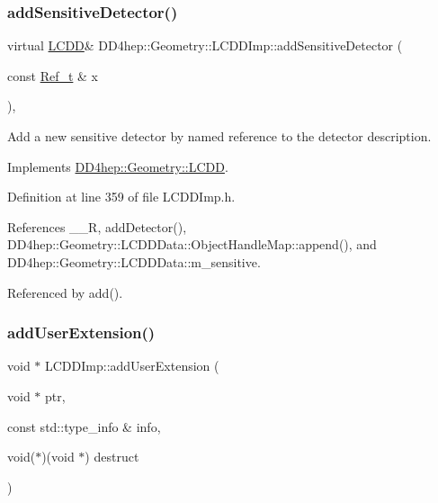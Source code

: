 \subsubsection{\texorpdfstring{add\+Sensitive\+Detector()}{addSensitiveDetector()}}
{\footnotesize\ttfamily virtual \hyperlink{class_d_d4hep_1_1_geometry_1_1_l_c_d_d}{L\+C\+DD}\& D\+D4hep\+::\+Geometry\+::\+L\+C\+D\+D\+Imp\+::add\+Sensitive\+Detector (\begin{DoxyParamCaption}\item[{const \hyperlink{group___d_d4_h_e_p___g_e_o_m_e_t_r_y_ga40af83be6718bb8828a3d83dc7f8c930}{Ref\+\_\+t} \&}]{x }\end{DoxyParamCaption})\hspace{0.3cm}{\ttfamily [inline]}, {\ttfamily [virtual]}}



Add a new sensitive detector by named reference to the detector description. 



Implements \hyperlink{class_d_d4hep_1_1_geometry_1_1_l_c_d_d_aa574186ef096f626835ea6f389769230}{D\+D4hep\+::\+Geometry\+::\+L\+C\+DD}.



Definition at line 359 of file L\+C\+D\+D\+Imp.\+h.



References \+\_\+\+\_\+R, add\+Detector(), D\+D4hep\+::\+Geometry\+::\+L\+C\+D\+D\+Data\+::\+Object\+Handle\+Map\+::append(), and D\+D4hep\+::\+Geometry\+::\+L\+C\+D\+D\+Data\+::m\+\_\+sensitive.



Referenced by add().

\hypertarget{class_d_d4hep_1_1_geometry_1_1_l_c_d_d_imp_a6a8e772cd986a1e6211b4e3b0b1ae997}{}\label{class_d_d4hep_1_1_geometry_1_1_l_c_d_d_imp_a6a8e772cd986a1e6211b4e3b0b1ae997} 
\subsubsection{\texorpdfstring{add\+User\+Extension()}{addUserExtension()}}
{\footnotesize\ttfamily void $\ast$ L\+C\+D\+D\+Imp\+::add\+User\+Extension (\begin{DoxyParamCaption}\item[{void $\ast$}]{ptr,  }\item[{const std\+::type\+\_\+info \&}]{info,  }\item[{void($\ast$)(void $\ast$)}]{destruct }\end{DoxyParamCaption})\hspace{0.3cm}{\ttfamily [virtual]}}



